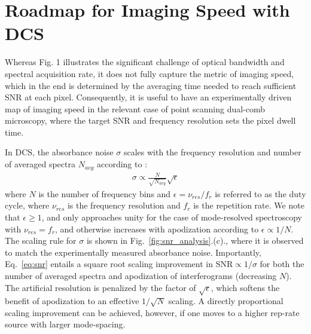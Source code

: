 \documentclass[aip,preprint]{revtex4-1}
\begin{document}

\section{Roadmap for Imaging Speed with DCS}
Whereas Fig. 1 illustrates the significant challenge of optical bandwidth and spectral acquisition rate, it does not fully capture the metric of imaging speed, which in the end is determined by the averaging time needed to reach sufficient SNR at each pixel. Consequently, it is useful to have an experimentally driven map of imaging speed in the relevant case of point scanning dual-comb microscopy, where the target SNR and frequency resolution sets the pixel dwell time.

In DCS, the absorbance noise $\sigma$ scales with the frequency resolution and number of averaged spectra $N_{avg}$ according to \cite{newburySensitivityCoherentDualcomb2010}: 
% 
\begin{align}
    \sigma \propto \frac{N}{\sqrt{N_{avg}}}\sqrt{\epsilon}
    \label{eq:snr}
\end{align}
% 
where $N$ is the number of frequency bins and $\epsilon=\nu_{res}/f_{r}$ is referred to as the duty cycle, where $\nu_{res}$ is the frequency resolution and $f_r$ is the repetition rate. We note that $\epsilon\geq 1$, and only approaches unity for the case of mode-resolved spectroscopy with $\nu_{res}=f_r$, and otherwise increases with apodization according to $\epsilon\propto1/N$. The scaling rule for $\sigma$ is shown in \mbox{Fig. \ref{fig:snr_analysis}.(c).}, where it is observed to match the experimentally measured absorbance noise. Importantly, \mbox{Eq. \ref{eq:snr}} entails a square root scaling improvement in \mbox{$\mathrm{SNR}\propto 1/\sigma$} for both the number of averaged spectra and apodization of interferograms (decreasing $N$). The artificial resolution is penalized by the factor of $\sqrt{\epsilon}$, which softens the benefit of apodization to an effective $1/\sqrt{N}$ scaling. A directly proportional scaling improvement can be achieved, however, if one moves to a higher rep-rate source with larger mode-spacing.
\end{document}
